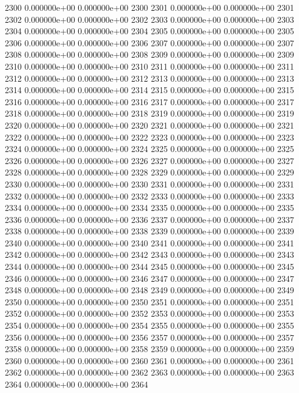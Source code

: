 \documentclass{article}
\begin{document}
\begin{Schunk}
\begin{Soutput}
2300   0.000000e+00   0.000000e+00 2300
2301   0.000000e+00   0.000000e+00 2301
2302   0.000000e+00   0.000000e+00 2302
2303   0.000000e+00   0.000000e+00 2303
2304   0.000000e+00   0.000000e+00 2304
2305   0.000000e+00   0.000000e+00 2305
2306   0.000000e+00   0.000000e+00 2306
2307   0.000000e+00   0.000000e+00 2307
2308   0.000000e+00   0.000000e+00 2308
2309   0.000000e+00   0.000000e+00 2309
2310   0.000000e+00   0.000000e+00 2310
2311   0.000000e+00   0.000000e+00 2311
2312   0.000000e+00   0.000000e+00 2312
2313   0.000000e+00   0.000000e+00 2313
2314   0.000000e+00   0.000000e+00 2314
2315   0.000000e+00   0.000000e+00 2315
2316   0.000000e+00   0.000000e+00 2316
2317   0.000000e+00   0.000000e+00 2317
2318   0.000000e+00   0.000000e+00 2318
2319   0.000000e+00   0.000000e+00 2319
2320   0.000000e+00   0.000000e+00 2320
2321   0.000000e+00   0.000000e+00 2321
2322   0.000000e+00   0.000000e+00 2322
2323   0.000000e+00   0.000000e+00 2323
2324   0.000000e+00   0.000000e+00 2324
2325   0.000000e+00   0.000000e+00 2325
2326   0.000000e+00   0.000000e+00 2326
2327   0.000000e+00   0.000000e+00 2327
2328   0.000000e+00   0.000000e+00 2328
2329   0.000000e+00   0.000000e+00 2329
2330   0.000000e+00   0.000000e+00 2330
2331   0.000000e+00   0.000000e+00 2331
2332   0.000000e+00   0.000000e+00 2332
2333   0.000000e+00   0.000000e+00 2333
2334   0.000000e+00   0.000000e+00 2334
2335   0.000000e+00   0.000000e+00 2335
2336   0.000000e+00   0.000000e+00 2336
2337   0.000000e+00   0.000000e+00 2337
2338   0.000000e+00   0.000000e+00 2338
2339   0.000000e+00   0.000000e+00 2339
2340   0.000000e+00   0.000000e+00 2340
2341   0.000000e+00   0.000000e+00 2341
2342   0.000000e+00   0.000000e+00 2342
2343   0.000000e+00   0.000000e+00 2343
2344   0.000000e+00   0.000000e+00 2344
2345   0.000000e+00   0.000000e+00 2345
2346   0.000000e+00   0.000000e+00 2346
2347   0.000000e+00   0.000000e+00 2347
2348   0.000000e+00   0.000000e+00 2348
2349   0.000000e+00   0.000000e+00 2349
2350   0.000000e+00   0.000000e+00 2350
2351   0.000000e+00   0.000000e+00 2351
2352   0.000000e+00   0.000000e+00 2352
2353   0.000000e+00   0.000000e+00 2353
2354   0.000000e+00   0.000000e+00 2354
2355   0.000000e+00   0.000000e+00 2355
2356   0.000000e+00   0.000000e+00 2356
2357   0.000000e+00   0.000000e+00 2357
2358   0.000000e+00   0.000000e+00 2358
2359   0.000000e+00   0.000000e+00 2359
2360   0.000000e+00   0.000000e+00 2360
2361   0.000000e+00   0.000000e+00 2361
2362   0.000000e+00   0.000000e+00 2362
2363   0.000000e+00   0.000000e+00 2363
2364   0.000000e+00   0.000000e+00 2364

\end{Soutput}
\end{Schunk}
\end{document}
